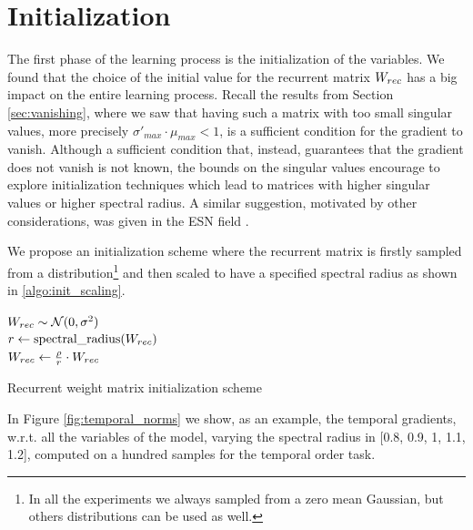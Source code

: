 \section{Initialization}
The first phase of the learning process is the initialization of the variables. We found that the choice of the initial value for the recurrent matrix $W_{rec}$ has a big impact on the entire learning process. Recall the results from Section  \ref{sec:vanishing}, where we saw that having such a matrix with too small singular values, more precisely $\sigma'_{max} \cdot \mu_{max} <1 $, is a sufficient condition for the gradient to vanish. Although a sufficient condition that, instead, guarantees that the gradient does not vanish is not known, the bounds on the singular values encourage to explore initialization techniques which lead to matrices with higher singular values or higher spectral radius. A similar suggestion, motivated by other considerations, was given in the ESN field \cite{reservoirSummary}.

We propose an initialization scheme where the recurrent matrix is firstly sampled from a distribution\footnote{In all the experiments we always sampled from a zero mean Gaussian, but others distributions can be used as well.} and then scaled to have a specified spectral radius as shown in \ref{algo:init_scaling}.

\begin{algorithm}[!h]
	\BlankLine

	$W_{rec} \sim \mathcal{N}(0, \sigma^2)$\\
	$r \gets \mbox{spectral\_radius}(W_{rec})$\\
	$W_{rec}\gets \frac{\rho}{r} \cdot W_{rec}$\\
	\caption{Recurrent weight matrix initialization scheme}
	\label{algo:init_scaling}
\end{algorithm}

 In Figure \ref{fig:temporal_norms} we show, as an example, the temporal gradients, w.r.t. all the variables of the model, varying the spectral radius in [0.8, 0.9, 1, 1.1, 1.2], computed on a hundred samples for the temporal order task.


